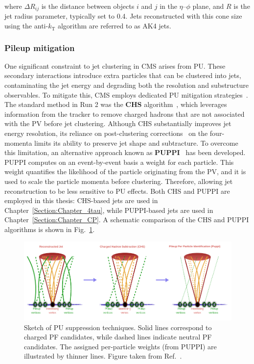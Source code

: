 where $\Delta R_{ij}$ is the distance between objects $i$ and $j$ in the $\eta$–$\phi$ plane, and $R$ is the jet radius parameter, typically set to 0.4. Jets reconstructed with this cone size using the anti-$k_\mathrm{T}$ algorithm are referred to as AK4 jets.

\subsubsection{Pileup mitigation}

One significant constraint to jet clustering in CMS arises from PU. These secondary interactions introduce extra particles that can be clustered into jets, contaminating the jet energy and degrading both the resolution and substructure observables. To mitigate this, CMS employs dedicated PU mitigation strategies~\cite{PU_Mitigation}. The standard method in Run 2 was the \textbf{\ac{CHS}} algorithm~\cite{ParticleFlow}, which leverages information from the tracker to remove charged hadrons that are not associated with the PV before jet clustering. Although CHS substantially improves jet energy resolution, its reliance on post-clustering corrections~\cite{JetEnergyCalibration} on the four-momenta limits its ability to preserve jet shape and subtracture. To overcome this limitation, an alternative approach known as \textbf{\ac{PUPPI}}~\cite{PUPPI} has been developed. PUPPI computes on an event-by-event basis a weight for each particle. This weight quantifies the likelihood of the particle originating from the PV, and it is used to scale the particle momenta before clustering. Therefore, allowing jet reconstruction to be less sensitive to PU effects. Both CHS and PUPPI are employed in this thesis: CHS-based jets are used in Chapter~\ref{Section:Chapter_4tau}, while PUPPI-based jets are used in Chapter~\ref{Section:Chapter_CP}. A schematic comparison of the CHS and PUPPI algorithms is shown in Fig.~\ref{Figure:Chapter4_Pileup_Schematic}.

\begin{figure}[h]
\centering
\includegraphics[width=\textwidth]{Figures/Chapter4/PU_Shematic.pdf}
\caption[Sketch of pileup suppression techniques]{
Sketch of PU suppression techniques. Solid lines correspond to charged PF candidates, while dashed lines indicate neutral PF candidates. The assigned per-particle weights (from PUPPI) are illustrated by thinner lines. Figure taken from Ref.~\cite{Jet_Reconstruction_Run2_Run3}.}
\label{Figure:Chapter4_Pileup_Schematic}
\end{figure}

